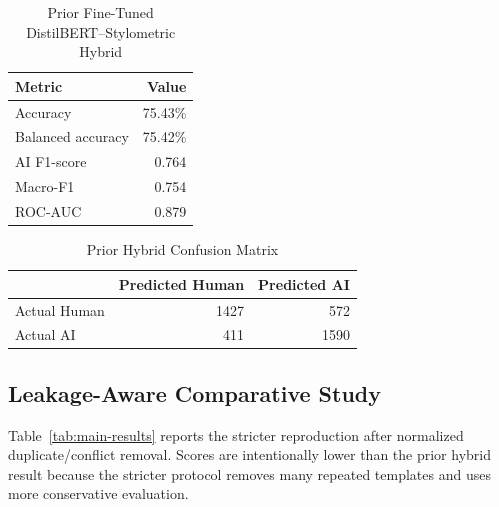 \documentclass[conference]{IEEEtran}
\begin{document}
\begin{table}[htbp]
\caption{Prior Fine-Tuned DistilBERT--Stylometric Hybrid}
\centering
\begin{tabular}{lr}
\toprule
Metric & Value \\
\midrule
Accuracy & 75.43\% \\
Balanced accuracy & 75.42\% \\
AI F1-score & 0.764 \\
Macro-F1 & 0.754 \\
ROC-AUC & 0.879 \\
\bottomrule
\end{tabular}
\label{tab:prior-hybrid}
\end{table}

\begin{table}[htbp]
\caption{Prior Hybrid Confusion Matrix}
\centering
\begin{tabular}{lrr}
\toprule
 & Predicted Human & Predicted AI \\
\midrule
Actual Human & 1427 & 572 \\
Actual AI & 411 & 1590 \\
\bottomrule
\end{tabular}
\label{tab:confusion}
\end{table}

\subsection{Leakage-Aware Comparative Study}
Table~\ref{tab:main-results} reports the stricter reproduction after normalized duplicate/conflict removal. Scores are intentionally lower than the prior hybrid result because the stricter protocol removes many repeated templates and uses more conservative evaluation.
\end{document}

